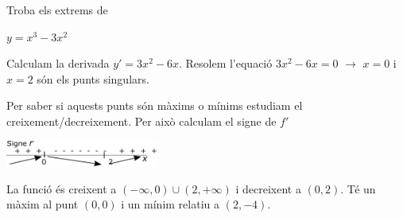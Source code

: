 		\begin{resolt}{Troba els extrems de
				
				 $y=x^3-3x^2$}
			Calculam la derivada $y'=3x^2-6x$. 
			Resolem l'equació $3x^2-6x=0$ $\rightarrow$ $x=0$ i $x=2$ són els punts singulars.
			\vspace{0.25cm}
			
			Per saber si aquests punts són màxims o mínims estudiam el creixement/decreixement. Per això calculam el signe de $f'$ 
			\vspace{0.35cm}
			
			\begin{center}
			\includegraphics[width=5cm]{img-07/signefprima}
			\end{center}
			\vspace{0.35cm}
			
			La funció és creixent a $(-\infty, 0) \cup (2,+\infty)$ i decreixent a $(0,2)$. Té un màxim al punt $(0,0)$ i un mínim relatiu a $(2,-4)$.
			
		\end{resolt}
	\vspace{0.5cm}
		
